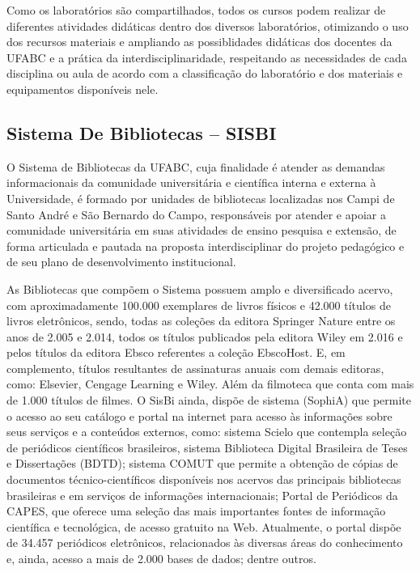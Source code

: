 Como os laboratórios são compartilhados, todos os cursos podem realizar de diferentes atividades didáticas dentro dos diversos laboratórios, otimizando o uso dos recursos materiais e ampliando as possiblidades didáticas dos docentes da UFABC e a prática da interdisciplinaridade, respeitando as necessidades de cada disciplina ou aula de acordo com a classificação do laboratório e dos materiais e equipamentos disponíveis nele.

\subsection{Sistema De Bibliotecas – SISBI}

O Sistema de Bibliotecas da UFABC, cuja finalidade é atender as demandas informacionais da comunidade universitária e científica interna e externa à Universidade, é formado por unidades de bibliotecas localizadas nos Campi de Santo André e São Bernardo do Campo, responsáveis por atender e apoiar a comunidade universitária em suas atividades de ensino pesquisa e extensão, de forma articulada e pautada na proposta interdisciplinar do projeto pedagógico e de seu plano de desenvolvimento institucional.

As Bibliotecas que compõem o Sistema possuem amplo e diversificado acervo, com aproximadamente 100.000 exemplares de livros físicos e 42.000 títulos de livros eletrônicos, sendo, todas as coleções da editora Springer Nature entre os anos de 2.005 e 2.014, todos os títulos publicados pela editora Wiley em 2.016 e pelos títulos da editora Ebsco referentes a coleção EbscoHost. E, em complemento, títulos resultantes de assinaturas anuais com demais editoras, como: Elsevier, Cengage Learning e Wiley. Além da filmoteca que conta com mais de 1.000 títulos de filmes.
O SisBi ainda, dispõe de sistema (SophiA) que permite o acesso ao seu catálogo e portal na internet para acesso às informações sobre seus serviços e a conteúdos externos, como: sistema Scielo que contempla seleção de periódicos científicos brasileiros, sistema Biblioteca Digital Brasileira de Teses e Dissertações (BDTD); sistema COMUT que permite a obtenção de cópias de documentos técnico-científicos disponíveis nos acervos das principais bibliotecas brasileiras e em serviços de informações internacionais; Portal de Periódicos da CAPES, que oferece uma seleção das mais importantes fontes de informação científica e tecnológica, de acesso gratuito na Web. Atualmente, o portal dispõe de 34.457 periódicos eletrônicos, relacionados às diversas áreas do conhecimento e, ainda, acesso a mais de 2.000 bases de dados; dentre outros.

